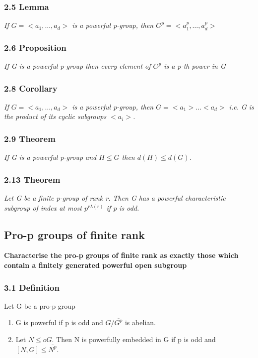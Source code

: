 \subsubsection*{2.5 Lemma}
\emph{If $G=<a_1, \dots, a_d>$ is a powerful p-group, then $G^p = <a_1^p, \dots, a_d^p>$}

\subsubsection*{2.6 Proposition}
\emph{If G is a powerful p-group then every element of $G^p$ is a p-th power in G}

\subsubsection*{2.8 Corollary}
\emph{If $G=<a_1, \dots, a_d>$ is a powerful p-group, then $G= <a_1>\dots <a_d>$ i.e. G is the product of its cyclic subgroups $<a_i>$.}

\subsubsection*{2.9 Theorem}
\emph{If G is a powerful p-group and $H\leq G$ then $d(H)\leq d(G)$.}

\subsubsection*{2.13 Theorem}
\emph{Let G be a finite p-group of rank r. Then G has a powerful characteristic subgroup of index at most $p^{r \lambda (r)}$ if p is odd.}





\subsection{Pro-p groups of finite rank}

\textbf{Characterise the pro-p groups of finite rank as exactly those which contain a finitely generated powerful open subgroup}

\subsubsection*{3.1 Definition}
Let G be a pro-p group
\begin{enumerate}
\item G is powerful if p is odd and $G/ \overline{G^p}$ is abelian.
\item  Let $N {\leq}o G$. Then N is powerfully embedded in G if p is odd and $[N,G] \leq \overline{N^p}$.
\end{enumerate}

